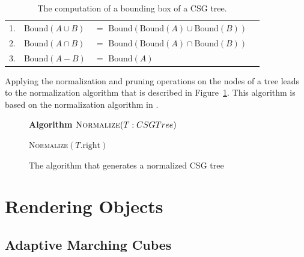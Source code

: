 \documentclass[a4paper,10pt,twoside]{report}
\newcommand{\Bound}{\mbox{Bound}}
\begin{document}
    \begin{table}[h]
        \begin{longtable}{llll}
            1. & $\Bound(A \cup B)$ & $=$ $\Bound(\Bound(A) \cup \Bound(B))$\\
            2. & $\Bound(A \cap B)$ & $=$ $\Bound(\Bound(A) \cap \Bound(B))$\\
            3. & $\Bound(A - B)$    & $=$ $\Bound(A)$\\
        \end{longtable}
        \caption{The computation of a bounding box of a CSG tree.}
        \label{table:bounding_box}
    \end{table}

    Applying the normalization and pruning operations on the nodes of a tree leads to the normalization algorithm that is described in  Figure~\ref{figure:algorithm}. This algorithm is based on the normalization algorithm in \cite{Wiegand96}.\\
    
    \begin{figure}[ht]
            \textbf{Algorithm} $\textsc{Normalize}(T: CSGTree)$\\
            \noindent
            \begin{algorithm}[H]
                \BlankLine
                \BlankLine
                \textsc{Normalize}$(T\mbox{.right})$\;
            \end{algorithm}
        \caption{The algorithm that generates a normalized CSG tree}
        \label{figure:algorithm}
    \end{figure}
    
\chapter{Rendering Objects}
\section{Adaptive Marching Cubes}
\end{document}
